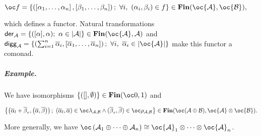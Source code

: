 \(\oc f =\left\{\left(\left[\alpha_1,\ldots,\alpha_n\right],\left[\beta_1,\ldots,\beta_n\right]\right);\  \forall i,\ (\alpha_i,\beta_i)\in f\right\} \in \mathbf{Fin}(\oc {\mathcal A}, \oc {\mathcal B}),\)

which defines a functor. Natural transformations
\(\mathsf{der}_{{\mathcal A}}=\left\{([\alpha],\alpha);\  \alpha\in \web{{\mathcal A}}\right\}\in\mathbf{Fin}(\oc{\mathcal A},{\mathcal A})\)
and
\(\mathsf{digg}_{{\mathcal A}}=\left\{\left(\sum_{i=1}^n\overline\alpha_i,\left[\overline\alpha_1,\ldots,\overline\alpha_n\right]\right);\ \forall i,\ \overline\alpha_i\in\web{\oc {\mathcal A}}\right\}\)
make this functor a comonad.

\subparagraph{Example.}\label{example.-3}

We have isomorphisms
\(\left\{([],\emptyset)\right\}\in\mathbf{Fin}(\oc\zero,\one)\) and

\(\left\{ \left(\overline\alpha_l+\overline\beta_r,\left(\overline\alpha,\overline\beta\right)\right);\ (\overline\alpha_l,\overline\alpha)\in\oc\lambda_{{\mathcal A},{\mathcal B}}\wedge(\overline\beta_r,\overline\beta)\in\oc\rho_{{\mathcal A},{\mathcal B}}\right\} \in\mathbf{Fin}(\oc({\mathcal A}\oplus{\mathcal B}),\oc{\mathcal A}\tens\oc{\mathcal B}).\)

More generally, we have
\(\oc\left({\mathcal A}_1\oplus\cdots\oplus{\mathcal A}_n\right)\cong\oc{\mathcal A}_1\tens\cdots\tens\oc{\mathcal A}_n\).

